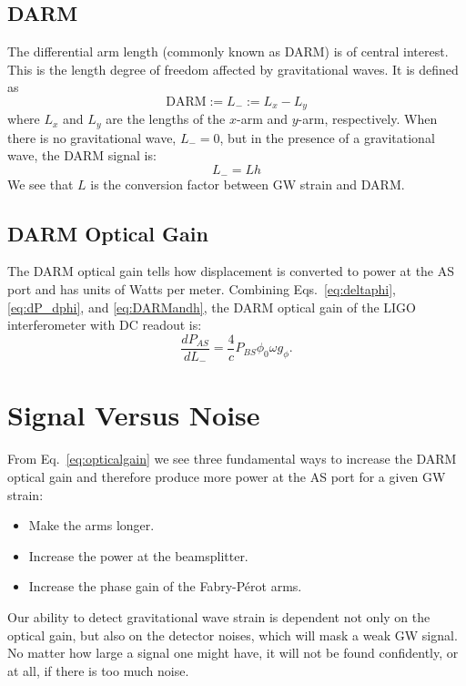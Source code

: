 \subsection{DARM}
The differential arm length (commonly known as DARM) is of central interest. This
is the length degree of freedom affected by gravitational waves. It is
defined as
\begin{equation}
\mathrm{DARM} := L_- := L_x - L_y
\end{equation}
where $L_x$ and $L_y$ are the lengths of the $x$-arm and $y$-arm,
respectively. When there is no gravitational wave, $L_-=0$, but in the
presence of a gravitational wave, the DARM signal is:
\begin{equation}
L_- = Lh
\label{eq:DARMandh}
\end{equation}
We see that $L$ is the conversion factor between GW strain and DARM.



\subsection{DARM Optical Gain}
The DARM optical gain tells how displacement is converted to power at
the AS port and has units of Watts per meter. Combining
Eqs.~\ref{eq:deltaphi}, \ref{eq:dP_dphi}, and \ref{eq:DARMandh}, the
DARM optical gain of the LIGO interferometer with DC readout is:
\begin{equation}
\frac{d P_{AS}}{dL_-} = \frac{4}{c} P_{BS} \phi_0 \omega g_{\phi}.
\label{eq:opticalgain}
\end{equation}




\section{Signal Versus Noise} 
From Eq.~\ref{eq:opticalgain} we see three fundamental
ways to increase the DARM optical gain and therefore produce more
power at the AS port for a given GW strain:
\begin{itemize}
\item Make the arms longer. \vspace{-10 pt}
\item Increase the power at the beamsplitter. \vspace{-10 pt}
\item Increase the phase gain of the Fabry-P\'{e}rot arms.
\end{itemize}
Our ability to detect gravitational wave strain is dependent not only
on the optical gain, but also on the detector noises, which will mask
a weak GW signal. No matter how large a signal one might have, it will
not be found confidently, or at all, if there is too much noise.


